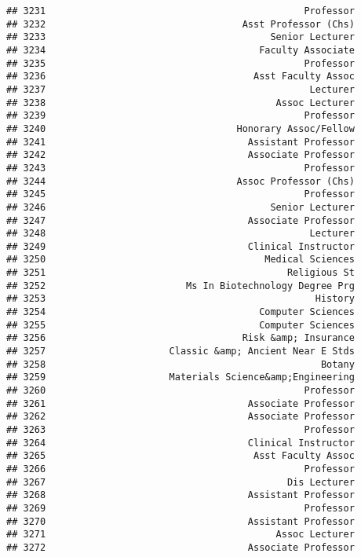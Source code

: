 \documentclass[
]{article}
\begin{document}
\begin{verbatim}
## 3231                                              Professor
## 3232                                   Asst Professor (Chs)
## 3233                                        Senior Lecturer
## 3234                                      Faculty Associate
## 3235                                              Professor
## 3236                                     Asst Faculty Assoc
## 3237                                               Lecturer
## 3238                                         Assoc Lecturer
## 3239                                              Professor
## 3240                                  Honorary Assoc/Fellow
## 3241                                    Assistant Professor
## 3242                                    Associate Professor
## 3243                                              Professor
## 3244                                  Assoc Professor (Chs)
## 3245                                              Professor
## 3246                                        Senior Lecturer
## 3247                                    Associate Professor
## 3248                                               Lecturer
## 3249                                    Clinical Instructor
## 3250                                       Medical Sciences
## 3251                                           Religious St
## 3252                         Ms In Biotechnology Degree Prg
## 3253                                                History
## 3254                                      Computer Sciences
## 3255                                      Computer Sciences
## 3256                                   Risk &amp; Insurance
## 3257                      Classic &amp; Ancient Near E Stds
## 3258                                                 Botany
## 3259                      Materials Science&amp;Engineering
## 3260                                              Professor
## 3261                                    Associate Professor
## 3262                                    Associate Professor
## 3263                                              Professor
## 3264                                    Clinical Instructor
## 3265                                     Asst Faculty Assoc
## 3266                                              Professor
## 3267                                           Dis Lecturer
## 3268                                    Assistant Professor
## 3269                                              Professor
## 3270                                    Assistant Professor
## 3271                                         Assoc Lecturer
## 3272                                    Associate Professor

\end{verbatim}
\end{document}
